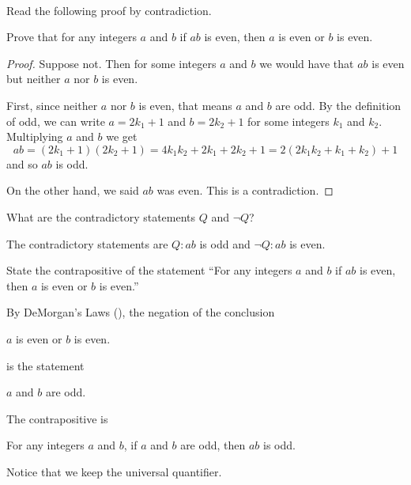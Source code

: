 \begin{exam} 
\label{exam_product_even_implies_even_factor}
~
    \begin{apart}
        
        \item \label{part_contradiction_product_even_implies_even_factor} Read the following proof by contradiction.
        
            Prove that for any integers $a$ and $b$ if $ab$ is even, then $a$ is even or $b$ is even. 
            
            \begin{proof}
                Suppose not.  Then for some integers $a$ and $b$ we would have that $ab$ is even but neither $a$ nor $b$ is even.  
                
                First, since neither $a$ nor $b$ is even, that means $a$ and $b$ are odd.  By the definition of odd, we can write $a = 2k_1+1$ and $b = 2k_2+1$ for some integers $k_1$ and $k_2$.  Multiplying $a$ and $b$ we get $$ ab=(2k_1+1)(2k_2+1)=4k_1k_2+2k_1+2k_2+1 = 2(2k_1k_2 + k_1 + k_2) + 1$$ and so $ab$ is odd.

                On the other hand, we said $ab$ was even.  This is a contradiction.
            \end{proof} 

            What are the contradictory statements $Q$ and $\neg Q$?
                \begin{soln}
                    The contradictory statements are $Q: ab$ is odd and $\neg Q: ab$ is even.
                \end{soln}
            
        \item State the contrapositive of the statement ``For any integers $a$ and $b$ if $ab$ is even, then $a$ is even or $b$ is even.'' 
            \begin{soln}
                By DeMorgan's Laws (), the negation of the conclusion
                    \begin{center}
                        $a$ is even or $b$ is even.
                    \end{center} 
                is the statement
                    \begin{center}
                        $a$ and $b$ are odd.
                    \end{center}
                The contrapositive is 
                    \begin{center}
                        For any integers $a$ and $b$, if $a$ and $b$ are odd, then $ab$ is odd.
                    \end{center}
                Notice that we keep the universal quantifier.  
            \end{soln}
        

\end{apart}
\end{exam}
